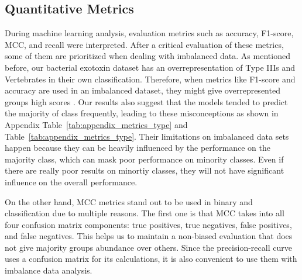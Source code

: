 \subsection{Quantitative Metrics}

During machine learning analysis, evaluation metrics such as accuracy, F1-score, \gls{MCC}, and recall were interpreted.
After a critical evaluation of these metrics, some of them are prioritized when dealing with imbalanced data.
As mentioned before, our bacterial exotoxin dataset has an overrepresentation of Type IIIs and Vertebrates in their own classification. Therefore, when metrics like F1-score and accuracy are used in an imbalanced dataset, they might give overrepresented groups high scores \cite{chicco2020advantages}. Our results also suggest that the models tended to predict the majority of class frequently, leading to these misconceptions as shown in Appendix Table~\ref{tab:appendix_metrics_type} and Table~\ref{tab:appendix_metrics_type}.
Their limitations on imbalanced data sets happen because they can be heavily influenced by the performance on the majority class, which can mask poor performance on minority classes. Even if there are really poor results on minortiy classes, they will not have significant influence on the overall performance.

On the other hand, \gls{MCC} metrics stand out to be used in binary and classification due to multiple reasons. The first one is that \gls{MCC} takes into all four confusion matrix components:  true positives, true negatives, false positives, and false negatives. This helps us to maintain a non-biased evaluation that does not give majority groups abundance over others. Since the precision-recall curve uses a confusion matrix for its calculations, it is also convenient to use them with imbalance data analysis.
